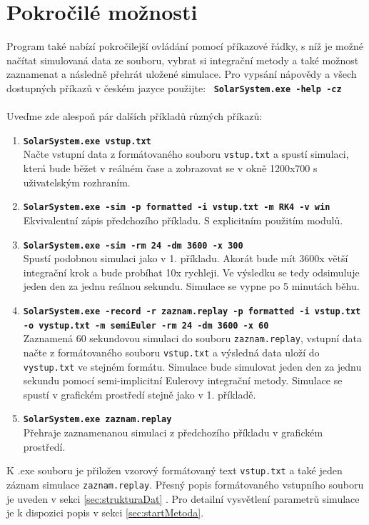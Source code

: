 \section{Pokročilé možnosti}
Program také nabízí pokročilejší ovládání pomocí příkazové řádky, s níž je možné načítat simulovaná data ze souboru, vybrat si integrační metody a také možnost zaznamenat a následně přehrát uložené simulace.
Pro vypsání nápovědy a všech dostupných příkazů v českém jazyce použijte:
\ \texttt{\textbf{SolarSystem.exe -help -cz}}
\\\\
Uveďme zde alespoň pár dalších příkladů různých příkazů:
\begin{enumerate}
	\item \texttt{\textbf{SolarSystem.exe vstup.txt}} \\
	Načte vstupní data z formátovaného souboru \texttt{vstup.txt} a spustí simulaci, která bude běžet v reálném čase a zobrazovat se v okně 1200x700 s uživatelským rozhraním.
	\item \texttt{\textbf{SolarSystem.exe -sim -p formatted -i vstup.txt -m RK4 -v win}} \\
	 Ekvivalentní zápis předchozího příkladu. S explicitním použitím modulů.
	\item \texttt{\textbf{SolarSystem.exe -sim -rm 24 -dm 3600 -x 300}} \\
	Spustí podobnou simulaci jako v 1. příkladu. Akorát bude mít 3600x větší integrační krok a bude probíhat 10x rychleji. Ve výsledku se tedy odsimuluje jeden den za jednu reálnou sekundu. Simulace se vypne po 5 minutách běhu.
	\item \texttt{\textbf{SolarSystem.exe -record -r zaznam.replay -p formatted -i vstup.txt -o vystup.txt -m semiEuler -rm 24 -dm 3600 -x 60}}\\
	Zaznamená 60 sekundovou simulaci do souboru \texttt{zaznam.replay}, vstupní data načte z formátovaného souboru \texttt{vstup.txt} a výsledná data uloží do \texttt{vystup.txt} ve stejném formátu. Simulace bude simulovat jeden den za jednu sekundu pomocí semi-implicitní Eulerovy integrační metody. Simulace se spustí v grafickém prostředí stejně jako v 1. příkladě.
	\item  \texttt{\textbf{SolarSystem.exe zaznam.replay}}\\
	Přehraje zaznamenanou simulaci z předchozího příkladu v grafickém prostředí.
\end{enumerate}
K .exe souboru je přiložen vzorový formátovaný text \texttt{vstup.txt} a také jeden záznam simulace \texttt{zaznam.replay}.
Přesný popis formátovaného vstupního souboru je uveden v sekci \ref{sec:strukturaDat} . Pro detailní vysvětlení parametrů simulace je k dispozici popis v sekci \ref{sec:startMetoda}.


